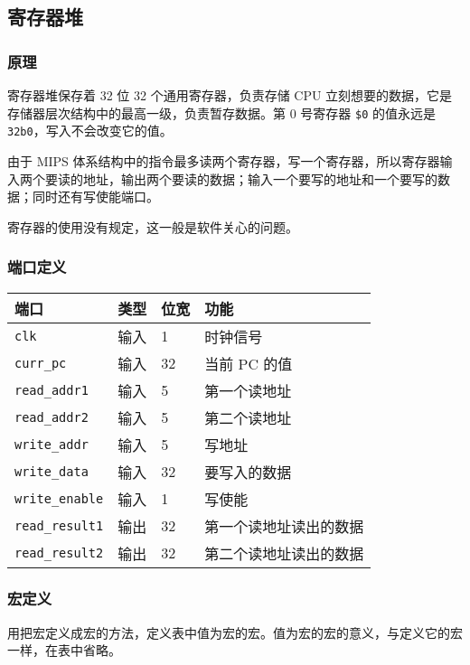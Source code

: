 \hypertarget{ux5bc4ux5b58ux5668ux5806}{%
\subsection{寄存器堆}\label{ux5bc4ux5b58ux5668ux5806}}

\hypertarget{ux539fux7406-2}{%
\subsubsection{原理}\label{ux539fux7406-2}}

寄存器堆保存着 32 位 32 个通用寄存器，负责存储 CPU
立刻想要的数据，它是存储器层次结构中的最高一级，负责暂存数据。第 0
号寄存器 \texttt{\$0} 的值永远是
\texttt{32\textquotesingle{}b0}，写入不会改变它的值。

由于 MIPS
体系结构中的指令最多读两个寄存器，写一个寄存器，所以寄存器输入两个要读的地址，输出两个要读的数据；输入一个要写的地址和一个要写的数据；同时还有写使能端口。

寄存器的使用没有规定，这一般是软件关心的问题。

\hypertarget{ux7aefux53e3ux5b9aux4e49-2}{%
\subsubsection{端口定义}\label{ux7aefux53e3ux5b9aux4e49-2}}

\begin{longtable}[]{@{}llll@{}}
\toprule
端口 & 类型 & 位宽 & 功能\tabularnewline
\midrule
\endhead
\texttt{clk} & 输入 & 1 & 时钟信号\tabularnewline
\texttt{curr\_pc} & 输入 & 32 & 当前 PC 的值\tabularnewline
\texttt{read\_addr1} & 输入 & 5 & 第一个读地址\tabularnewline
\texttt{read\_addr2} & 输入 & 5 & 第二个读地址\tabularnewline
\texttt{write\_addr} & 输入 & 5 & 写地址\tabularnewline
\texttt{write\_data} & 输入 & 32 & 要写入的数据\tabularnewline
\texttt{write\_enable} & 输入 & 1 & 写使能\tabularnewline
\texttt{read\_result1} & 输出 & 32 &
第一个读地址读出的数据\tabularnewline
\texttt{read\_result2} & 输出 & 32 &
第二个读地址读出的数据\tabularnewline
\bottomrule
\end{longtable}

\hypertarget{ux5b8fux5b9aux4e49-3}{%
\subsubsection{宏定义}\label{ux5b8fux5b9aux4e49-3}}

用把宏定义成宏的方法，定义表中值为宏的宏。值为宏的宏的意义，与定义它的宏一样，在表中省略。


